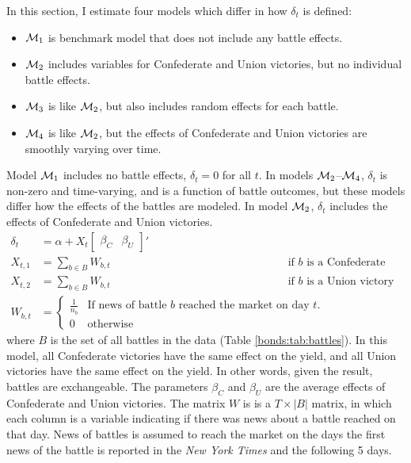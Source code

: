 In this section, I estimate four models which differ in how $\delta_{t}$ is defined:
\begin{itemize}
\item $\mathcal{M}_{\text{1}}$ is benchmark model that does not include any battle effects.
\item $\mathcal{M}_{\text{2}}$ includes variables for Confederate and Union victories, but no individual battle effects.
\item $\mathcal{M}_{\text{3}}$ is like $\mathcal{M}_{\text{2}}$, but also includes random effects for each battle.
\item $\mathcal{M}_{\text{4}}$ is like $\mathcal{M}_{\text{2}}$, but the effects of Confederate and Union victories are smoothly varying over time.
\end{itemize}
Model $\mathcal{M}_{\text{1}}$ includes no battle effects, $\delta_{t} = 0$ for all $t$.
In models $\mathcal{M}_{\text{2}}$--$\mathcal{M}_{\text{4}}$, $\delta_{t}$ is non-zero and time-varying, and is a function of battle outcomes, but these models differ how the effects of the battles are modeled.
In model $\mathcal{M}_{\text{2}}$, $\delta_{t}$ includes the effects of Confederate and Union victories.
\begin{align}
  \label{bonds:eq:2}
  \delta_{t} &= \alpha + X_{t} \begin{bmatrix}\beta_{C} & \beta_{U}\end{bmatrix}'  \\
  X_{t, 1} &= \sum_{b \in B} W_{b,t} && \text{if $b$ is a Confederate victory} \\
  X_{t, 2} &= \sum_{b \in B} W_{b,t} && \text{if $b$ is a Union victory} \\
  W_{b,t} &= 
            \begin{cases}
              \frac{1}{n_{b}} & \text{If news of battle $b$ reached the market on day $t$.} \\
              0 & \text{otherwise}
            \end{cases}
\end{align}
where $B$ is the set of all battles in the data (Table \ref{bonds:tab:battles}).
In this model, all Confederate victories have the same effect on the yield, and all Union victories have the same effect on the yield. 
In other words, given the result, battles are exchangeable.
The parameters $\beta_{C}$ and $\beta_{U}$ are the average effects of Confederate and Union victories.
The matrix $W$ is is a $T \times |B|$ matrix, in which each column is a variable indicating if there was news about a battle reached on that day.
News of battles is assumed to reach the market on the days the first news of the battle is reported in the \textit{New York Times} and the following 5 days.

